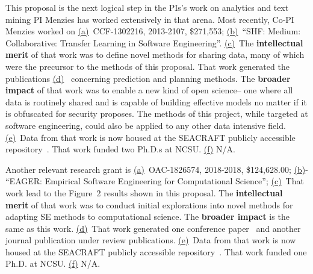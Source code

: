\documentclass{NSF}
\begin{document}
\begin{nsfdescription}
This proposal is the next logical step in the PIs's work on analytics and text mining
{PI Menzies} has worked extensively in that arena.
Most  recently, Co-PI Menzies worked on \underline{(a)}~CCF-1302216, 2013-2107, \$271,553;   \underline{(b)}~``SHF: Medium: Collaborative: Transfer Learning in Software Engineering''. 
\underline{(c)}~The {\bf intellectual merit} of that work was to
define novel methods for sharing data, many of which were the precursor to the methods of this proposal.  That work generated the publications  \underline{(d)}~\cite{krishna2018bellwethers,PetersML15,krishna16,he13,Me17,fu2016tuning,krishna2017learning} concerning prediction and planning methods.
The {\bf broader impact} of that work was to
enable a new kind of open science-- one where all data is routinely shared and is capable of building effective models no matter if it is obfuscated for security proposes.
The methods of this project, while targeted at software engineering, could also be applied to any other data intensive field.   
 \underline{(e)}~Data from that work is now housed at the SEACRAFT publicly accessible repository~\cite{seacraft}. That work  funded two Ph.D.s at NCSU. \underline{(f)}
N/A.  

Another relevant research grant is 
\underline{(a)}~OAC-1826574, 2018-2018, 
\$124,628.00;
\underline{(b)}-
``EAGER: Empirical Software Engineering for Computational Science'';
\underline{(c)}~That work lead to the Figure~2 results
shown in this proposal.
The {\bf intellectual merit} of that work was to
conduct initial explorations into novel methods for adapting SE methods to computational science.
The {\bf broader impact} is the same as this work.
\underline{(d)}~That work generated one conference paper~\cite{abs-1807-11112}
and another journal publication under review publications.
 \underline{(e)}~Data from that work is now housed at the SEACRAFT publicly accessible repository~\cite{seacraft}. That work  funded one Ph.D. at NCSU. 
 \underline{(f)} N/A.  






\end{nsfdescription}
\end{document}
